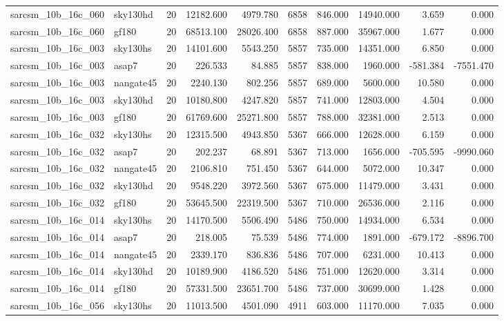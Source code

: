 \begin{longtable}{llrrrrrrrr}
sarcsm\_10b\_16c\_060 & sky130hd & 20 & 12182.600 & 4979.780 & 6858 & 846.000 & 14940.000 & 3.659 & 0.000 \\
sarcsm\_10b\_16c\_060 & gf180 & 20 & 68513.100 & 28026.400 & 6858 & 887.000 & 35967.000 & 1.677 & 0.000 \\
sarcsm\_10b\_16c\_003 & sky130hs & 20 & 14101.600 & 5543.250 & 5857 & 735.000 & 14351.000 & 6.850 & 0.000 \\
sarcsm\_10b\_16c\_003 & asap7 & 20 & 226.533 & 84.885 & 5857 & 838.000 & 1960.000 & -581.384 & -7551.470 \\
sarcsm\_10b\_16c\_003 & nangate45 & 20 & 2240.130 & 802.256 & 5857 & 689.000 & 5600.000 & 10.580 & 0.000 \\
sarcsm\_10b\_16c\_003 & sky130hd & 20 & 10180.800 & 4247.820 & 5857 & 741.000 & 12803.000 & 4.504 & 0.000 \\
sarcsm\_10b\_16c\_003 & gf180 & 20 & 61769.600 & 25271.800 & 5857 & 788.000 & 32381.000 & 2.513 & 0.000 \\
sarcsm\_10b\_16c\_032 & sky130hs & 20 & 12315.500 & 4943.850 & 5367 & 666.000 & 12628.000 & 6.159 & 0.000 \\
sarcsm\_10b\_16c\_032 & asap7 & 20 & 202.237 & 68.891 & 5367 & 713.000 & 1656.000 & -705.595 & -9990.060 \\
sarcsm\_10b\_16c\_032 & nangate45 & 20 & 2106.810 & 751.450 & 5367 & 644.000 & 5072.000 & 10.347 & 0.000 \\
sarcsm\_10b\_16c\_032 & sky130hd & 20 & 9548.220 & 3972.560 & 5367 & 675.000 & 11479.000 & 3.431 & 0.000 \\
sarcsm\_10b\_16c\_032 & gf180 & 20 & 53645.500 & 22319.500 & 5367 & 710.000 & 26536.000 & 2.116 & 0.000 \\
sarcsm\_10b\_16c\_014 & sky130hs & 20 & 14170.500 & 5506.490 & 5486 & 750.000 & 14934.000 & 6.534 & 0.000 \\
sarcsm\_10b\_16c\_014 & asap7 & 20 & 218.005 & 75.539 & 5486 & 774.000 & 1891.000 & -679.172 & -8896.700 \\
sarcsm\_10b\_16c\_014 & nangate45 & 20 & 2339.170 & 836.836 & 5486 & 707.000 & 6231.000 & 10.413 & 0.000 \\
sarcsm\_10b\_16c\_014 & sky130hd & 20 & 10189.900 & 4186.520 & 5486 & 751.000 & 12620.000 & 3.314 & 0.000 \\
sarcsm\_10b\_16c\_014 & gf180 & 20 & 57331.500 & 23651.700 & 5486 & 737.000 & 30699.000 & 1.428 & 0.000 \\
sarcsm\_10b\_16c\_056 & sky130hs & 20 & 11013.500 & 4501.090 & 4911 & 603.000 & 11170.000 & 7.035 & 0.000 \\

\end{longtable}
